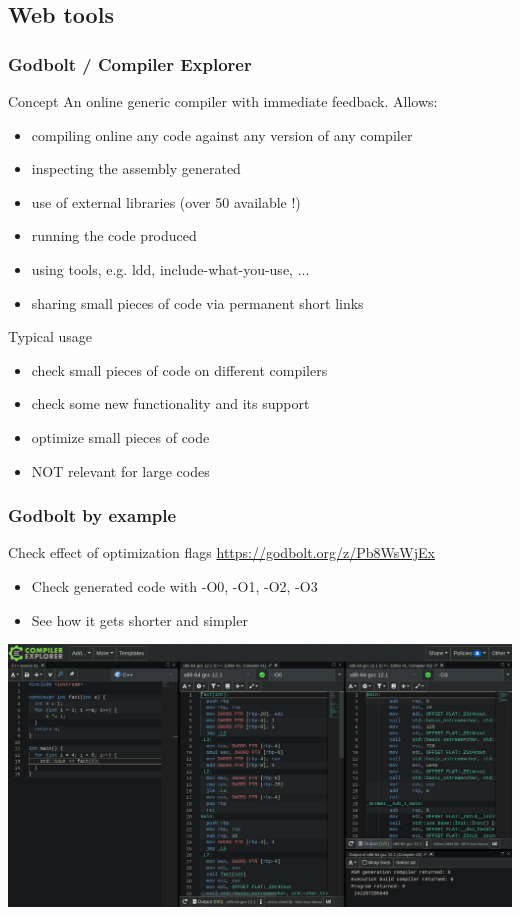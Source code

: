 \subsection[web]{Web tools}

\begin{frame}
  \frametitle{Godbolt / Compiler Explorer }
  \begin{block}{Concept}
    An online generic compiler with immediate feedback.
    Allows:
    \begin{itemize}
    \item compiling online any code against any version of any compiler
    \item inspecting the assembly generated
    \item use of external libraries (over 50 available !)
    \item running the code produced
    \item using tools, e.g. ldd, include-what-you-use, ...
    \item sharing small pieces of code via permanent short links
    \end{itemize}
  \end{block}
  \begin{exampleblock}{Typical usage}
    \begin{itemize}
    \item check small pieces of code on different compilers
    \item check some new \cpp functionality and its support
    \item optimize small pieces of code
    \item NOT relevant for large codes
    \end{itemize}
  \end{exampleblock}
\end{frame}

\begin{frame}
  \frametitle{Godbolt by example}
  \begin{block}{Check effect of optimization flags}
    \url{https://godbolt.org/z/Pb8WsWjEx}
    \begin{itemize}
    \item Check generated code with -O0, -O1, -O2, -O3
    \item See how it gets shorter and simpler
    \end{itemize}
  \end{block}
  \includegraphics[width=\textwidth]{tools/godbolt.png}
\end{frame}

